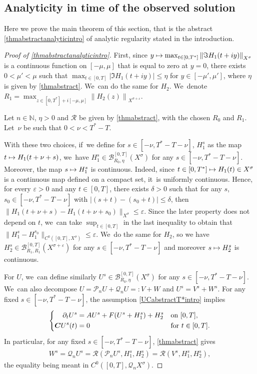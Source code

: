 \documentclass[JEP,XML,SOM,Unicode,published]{cedram}
\newcommand\mto{\mathchoice{\longmapsto}{\mapsto}{\mapsto}{\mapsto}}
\theoremstyle{definition}
\let\mc\mathcal
\let\veps\varepsilon
\newcommand{\B}{\mc{B}}
\newcommand{\N}{\mathbb{N}}
\newcommand{\Q}{\mathcal{Q}}
\renewcommand{\P}{\mathcal{P}}
\newcommand{\bC}{\boldsymbol{C}}
\providecommand{\norm}[1]{\lVert#1\rVert}
\newcommand\nor[2]{\left\|#1\right\|_{#2}}
\begin{document}
\subsection{Analyticity in time of the observed solution} Here we prove the main theorem of this section, that is the abstract \cref{thmabstractanalyticintro} of analytic regularity stated in the introduction.
\begin{proof}[Proof of \cref{thmabstractanalyticintro}]
First, since $y\mto \max_{t\in [0,T^{*}]}\nor{\Im H_{1}(t+iy)}{X^{\sigma}}$ is a continuous function on $[-\mu,\mu]$ that is equal to zero at $y=0$, there exists $0<\mu'<\mu$ such that $\max_{t\in [0,T]}\left|\Im H_{1}(t+iy)\right| \leq \eta$ for $y\in [-\mu',\mu']$, where $\eta$ is given by \cref{thmabstract}. We~can do the same for $H_{2}$. We~denote $R_{1}=\max_{z\in [0,T^{*}]+i[-\mu,\mu]}\nor{H_{2}(z)}{X^{\sigma+\veps}}$.

Let $n\in \N$, $\eta>0$ and $\mathcal{R}$ be given by \cref{thmabstract}, with the chosen $R_0$ and $R_{1}$. Let~$\nu$ be such that $0<\nu<T^*-T$.

With these two choices, if~we define for $s\in [-\nu, T^*-T-\nu]$, $H_{1}^{s}$ as the map $t\mto H_{1}(t+\nu+s)$, we~have $H_{1}^{s} \in \B_{R_{0},\eta}^{[0,T]}(X^{\sigma})$ for any $s\in [-\nu, T^*-T-\nu]$. Moreover, the map $s\mto H_1^s$ is continuous. Indeed, since $t\in [0, T^*]\mto H_1(t)\in X^\sigma$ is a continuous map defined on a compact set, it~is uniformly continuous. Hence, for every $\veps>0$ and any $t\in [0, T]$, there exists $\delta>0$ such that for any $s$, $s_0\in [-\nu, T^*-T-\nu]$ with $|(s+t)-(s_0+t)|\leq \delta$, then $\norm{H_1(t+\nu+s)-H_1(t+\nu+s_0)}_{X^\sigma}\leq \veps$. Since the later property does not depend on $t$, we~can take $\sup_{t\in [0, T]}$ in the last inequality to obtain that $\norm{H_1^s-H_1^{s_0}}_{C^0([0, T], X^\sigma)}\leq \veps$. We~do the same for $H_2$, so we have $H_2^s\in \B_{R_{1},R_{1}}^{[0,T]}(X^{\sigma+\veps})$ for any $s\in [-\nu, T^*-T-\nu]$ and moreover $s\mto H_2^s$ is continuous.

For $U$, we~can define similarly $U^s\in \B_{R_{0},\eta}^{[0,T]}(X^{\sigma})$ for any $s\in [-\nu, T^*-T-\nu]$. We~can also decompose $U=\P_n U+\Q_n U=:V+W$ and $U^s=V^s+W^s$. For any fixed $s\in [-\nu, T^*-T-\nu]$, the assumption \eqref{UCabstractT*intro} implies
\begin{align}\label{UCabstractwiths}
\left\{\begin{aligned}
\partial_t U^s&=AU^s+F(U^s+H_{1}^s)+H_{2}^s&& \textnormal{on } [0,T],\\
\bC U^s(t)&=0 &&\textnormal{for }t\in [0,T].
\end{aligned}\right.
\end{align}
In particular, for any fixed $s\in [-\nu, T^*-T-\nu]$, \cref{thmabstract} gives
\begin{align}
\label{equalWs}
W^s=\Q_n U^s=\mathcal{R}(\P_{n}U^s,H_{1}^s,H_{2}^s)=\mathcal{R}(V^s,H_{1}^s,H_{2}^s),
\end{align} the equality being meant in $C^0([0,T], \Q_n X^{\sigma})$.


\end{proof}
\end{document}
